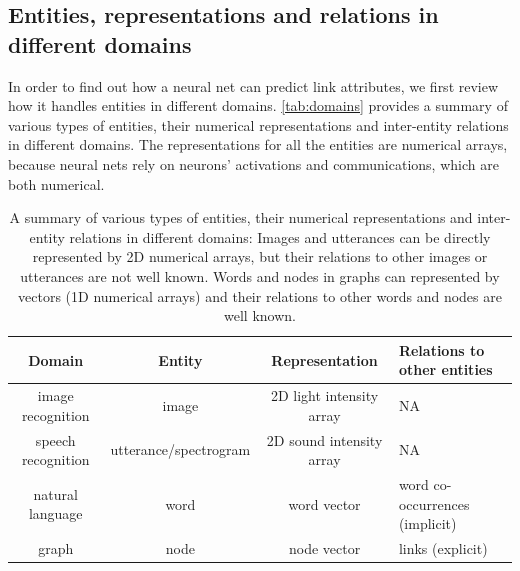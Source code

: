 \documentclass{article}
\begin{document}
\subsection{Entities, representations and relations in different domains}
In order to find out how a neural net can predict link attributes, we first 
review how it handles entities in different domains.
\autoref{tab:domains} provides a summary of various types of entities, their 
numerical representations and inter-entity relations in different domains.
The representations for all the entities are numerical arrays, 
because neural nets rely on neurons' activations and communications, which 
are both numerical.
\begin{table}[h]
	\centering
	\caption{A summary of various types of entities, their numerical
		representations and inter-entity relations in different domains:
		Images and utterances can be directly represented by 2D numerical 
		arrays, 
		but their relations to other images or utterances are not well known. 
		Words and nodes in graphs can represented by vectors (1D numerical 
		arrays) and their relations to other words and nodes are well known.}
	\begin{tabularx}{\textwidth}{ |c|c|c|X| } \hline
		\textbf{Domain} & \textbf{Entity} & \textbf{Representation} & 
		\textbf{Relations to other entities} \\ \hline
		image recognition & image & 2D light intensity array & NA \\ \hline
		speech recognition & utterance/spectrogram & 2D sound intensity array & 
		NA \\ \hline
		natural language & word & word vector & word co-occurrences (implicit) 
		\\ \hline
		graph & node & node vector & links (explicit) \\ \hline
	\end{tabularx}
	\label{tab:domains}
\end{table}
\end{document}
